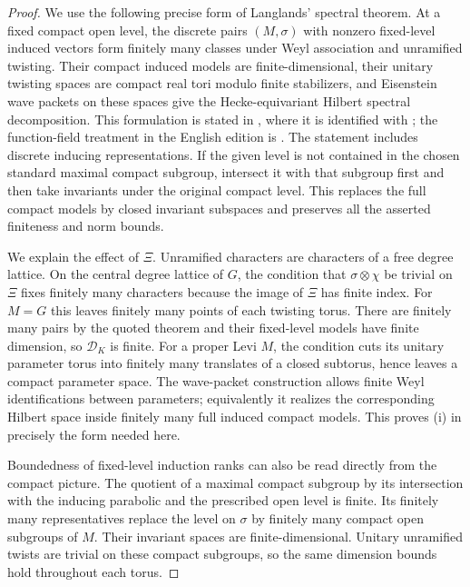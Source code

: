 \begin{proof}
 We use the following precise form of Langlands' spectral theorem.
 At a fixed compact open level, the discrete pairs $(M,\sigma)$ with
 nonzero fixed-level induced vectors form finitely many classes under
 Weyl association and unramified twisting.  Their compact induced
 models are finite-dimensional, their unitary twisting spaces are
 compact real tori modulo finite stabilizers, and Eisenstein wave
 packets on these spaces give the Hecke-equivariant Hilbert spectral
 decomposition.  This formulation is stated in
 \cite[Theorem III.7 and the preceding definitions, pp.~33--36]{LLafforgueSpectral},
 where it is identified with \cite[Section VI.2.1]{MW}; the
 function-field treatment in the English edition is
 \cite[Section VI.2.7]{MW}.  The statement includes discrete inducing
 representations.  If the given level is not contained in the chosen
 standard maximal compact subgroup, intersect it with that subgroup
 first and then take invariants under the original compact level.
 This replaces the full compact models by closed invariant subspaces
 and preserves all the asserted finiteness and norm bounds.

 We explain the effect of $\Xi$.  Unramified characters are characters
 of a free degree lattice.  On the central degree lattice of $G$, the
 condition that $\sigma\otimes\chi$ be trivial on $\Xi$ fixes finitely
 many characters because the image of $\Xi$ has finite index.
 For $M=G$ this leaves finitely many points of each twisting torus.
 There are finitely many pairs by the quoted theorem and their
 fixed-level models have finite dimension, so $\mathcal D_K$ is finite.
 For a proper Levi $M$, the condition cuts its unitary parameter torus
 into finitely many translates of a closed subtorus, hence leaves a
 compact parameter space.  The wave-packet construction allows finite
 Weyl identifications between parameters; equivalently it realizes
 the corresponding Hilbert space inside finitely many full induced
 compact models.  This proves (i) in precisely the form needed here.

 Boundedness of fixed-level induction ranks can also be read directly
 from the compact picture.  The quotient of a maximal compact subgroup
 by its intersection with the inducing parabolic and the prescribed
 open level is finite.  Its finitely many representatives replace the
 level on $\sigma$ by finitely many compact open subgroups of $M$.
 Their invariant spaces are finite-dimensional.  Unitary unramified
 twists are trivial on these compact subgroups, so the same dimension
 bounds hold throughout each torus.


\end{proof}
